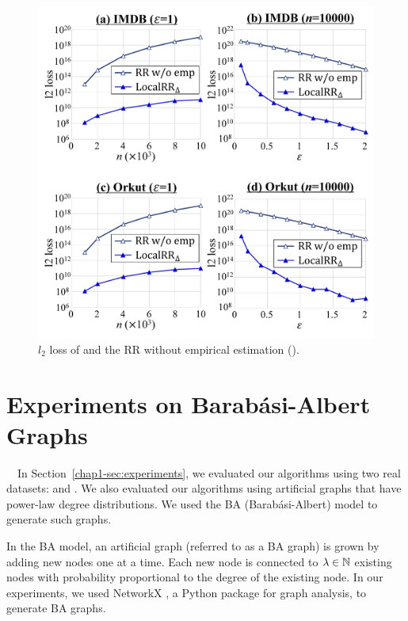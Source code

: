 \begin{figure}[t]
\centering
\includegraphics[width=0.99\linewidth]{fig/res5_RR_wo_emp.pdf}
\vspace{-5mm}
\caption{$l_2$ loss of  and the RR without empirical estimation ().}
\label{chap1-fig:res5_RR_wo_emp}
\end{figure}

\section{Experiments on Barab\'{a}si-Albert Graphs}
\label{chap1-sec:BAGraph}
{}~~In Section~\ref{chap1-sec:experiments}, we evaluated our algorithms using two real datasets: \IMDB{} and \Orkut{}. 
We also evaluated our algorithms using artificial graphs that have power-law degree distributions. 
We used the BA (Barab\'{a}si-Albert) model \cite{NetworkScience} to generate such graphs.

In the BA model, an artificial graph (referred to as a BA graph)
is grown by adding new nodes one at a time. 
Each new node is connected to $\lambda \in \mathbb{N}$ existing nodes with probability proportional to the degree of the existing node. 
In our experiments, we used 
NetworkX \cite{Hagberg_SciPy08}, a Python package for graph analysis, to generate BA graphs.

